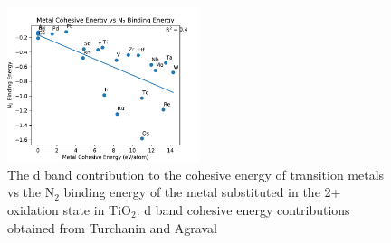 \documentclass[catalysts,article,submit,moreauthors,pdftex,10pt,a4paper]{mdpi}
\theoremstyle{mdpi}
\newcounter{ex}
\newcounter{re}
\theoremstyle{mdpidefinition}
\begin{document}
\begin{figure}
    \centering
    \includegraphics[width=0.5\textwidth]{Images/cohesive_eng_vs_N2.pdf}
    
    \caption{The d band contribution to the cohesive energy of transition metals vs the N$_2$ binding energy of the metal substituted in the 2+ oxidation state in TiO$_2$. d band cohesive energy contributions obtained from Turchanin and Agraval\cite{Turchanin_2008}}
    \label{fig:N2_cohesive}
\end{figure}

\end{document}
